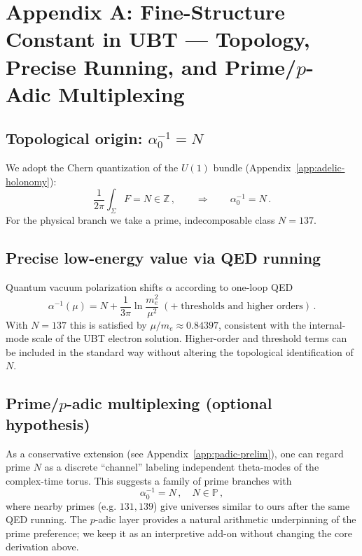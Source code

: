 
\section{Appendix A: Fine-Structure Constant in UBT — Topology, Precise Running, and Prime/$p$-Adic Multiplexing}
\label{app:alpha-consolidated}

\subsection{Topological origin: \(\alpha_0^{-1}=N\)}
We adopt the Chern quantization of the \(U(1)\) bundle (Appendix~\ref{app:adelic-holonomy}):
\begin{equation}
\frac{1}{2\pi}\int_{\Sigma} F = N \in \mathbb{Z}\,, \qquad \Rightarrow \qquad \alpha_0^{-1}=N\,.
\end{equation}
For the physical branch we take a prime, indecomposable class \(N=137\).

\subsection{Precise low-energy value via QED running}
Quantum vacuum polarization shifts \(\alpha\) according to one-loop QED
\begin{equation}
\alpha^{-1}(\mu) = N + \frac{1}{3\pi}\ln\!\frac{m_e^2}{\mu^2} \;(+\;\text{thresholds and higher orders})\,.
\end{equation}
With \(N=137\) this is satisfied by \(\mu/m_e \approx 0.84397\), consistent with the internal-mode scale of the UBT electron solution.
Higher-order and threshold terms can be included in the standard way without altering the topological identification of \(N\).

\subsection{Prime/$p$-adic multiplexing (optional hypothesis)}
As a conservative extension (see Appendix~\ref{app:padic-prelim}), one can regard prime \(N\) as a discrete ``channel'' labeling independent
theta-modes of the complex-time torus. This suggests a family of prime branches with
\begin{equation}
\alpha_0^{-1}=N\,, \quad N\in\mathbb{P}\,,
\end{equation}
where nearby primes (e.g. \(131, 139\)) give universes similar to ours after the same QED running. The $p$-adic layer
provides a natural arithmetic underpinning of the prime preference; we keep it as an interpretive add-on without changing the
core derivation above.
